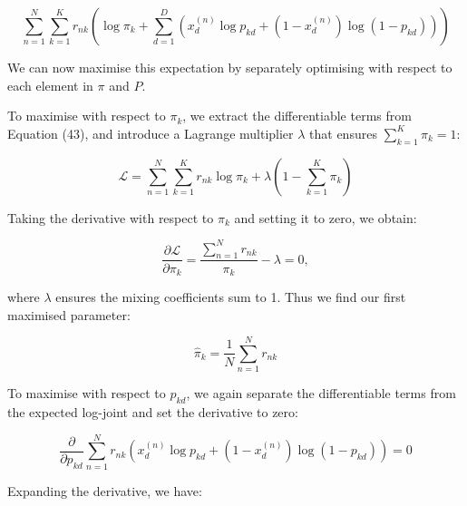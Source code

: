 \documentclass{article}
\begin{document}
\begin{enumerate}
    \begin{equation}
    \sum_{n=1}^N \sum_{k=1}^K r_{nk} \left( \log \pi_k + \sum_{d=1}^D \left( x_d^{(n)} \log p_{kd} + (1 - x_d^{(n)}) \log (1 - p_{kd}) \right) \right)
    \end{equation}

    \vspace{5pt}
    
    We can now maximise this expectation by separately optimising with respect to each element in \( \pi \) and \( P \).
    
    \vspace{10pt}
    
    To maximise with respect to \( \pi_k \), we extract the differentiable terms from Equation (43), and introduce a Lagrange multiplier \( \lambda \) that ensures \( \sum_{k=1}^K \pi_k = 1 \):
    
    \begin{equation}
    \mathcal{L} = \sum_{n=1}^N \sum_{k=1}^K r_{nk} \log \pi_k + \lambda \left( 1 - \sum_{k=1}^K \pi_k \right)
    \end{equation}
    
    Taking the derivative with respect to \( \pi_k \) and setting it to zero, we obtain:
    
    \begin{equation}
    \frac{\partial \mathcal{L}}{\partial \pi_k} = \frac{\sum_{n=1}^N r_{nk}}{\pi_k} - \lambda = 0,
    \end{equation}

    where \( \lambda \) ensures the mixing coefficients sum to 1. Thus we find our first maximised parameter:

    \begin{equation}
    \boxed{\hat{\pi}_k = \frac{1}{N} \sum_{n=1}^N r_{nk}}
    \end{equation}
    
    \vspace{5pt}
    
    To maximise with respect to \( p_{kd{}} \), we again separate the differentiable terms from the expected log-joint and set the derivative to zero: 
    
    \begin{equation}
        \frac{\partial}{\partial p_{kd}} \sum_{n=1}^N r_{nk} \left( x_d^{(n)} \log p_{kd} + (1 - x_d^{(n)}) \log (1 - p_{kd}) \right) = 0
    \end{equation}
    
    Expanding the derivative, we have:
    

\end{enumerate}
\end{document}
